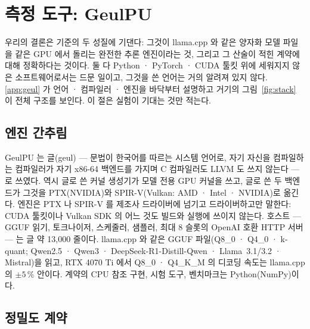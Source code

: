 \documentclass[11pt]{article}
\begin{document}
\section{측정 도구: GeulPU}\label{sec:instrument}

우리의 결론은 기준의 두 성질에 기댄다: 그것이 llama.cpp 와 같은 양자화 모델 파일을 같은 GPU 에서 돌리는 완전한 추론 엔진이라는
것, 그리고 그 산술이 적힌 계약에 대해 정확하다는 것이다. 둘 다 Python · PyTorch · CUDA 툴킷 위에 세워지지 않은 소프트웨어로서는
드문 일이고, 그것을 쓴 언어는 거의 알려져 있지 않다. \ref{app:geul} 가 언어 · 컴파일러 · 엔진을 바닥부터 설명하고 거기의
그림~\ref{fig:stack} 이 전체 구조를 보인다. 이 절은 실험이 기대는 것만 적는다.

\subsection{엔진 간추림}\label{sec:brief}

GeulPU 는 글(geul) --- 문법이 한국어를 따르는 시스템 언어로, 자기 자신을 컴파일하는 컴파일러가 자기 x86-64 백엔드를 가지며 C
컴파일러도 LLVM 도 쓰지 않는다 --- 로 쓰였다. 역시 글로 쓴 커널 생성기가 모델 전용 GPU 커널을 쓰고, 글로 쓴 두 백엔드가 그것을
PTX(NVIDIA)와 SPIR-V(Vulkan: AMD · Intel · NVIDIA)로 옮긴다. 엔진은 PTX 나 SPIR-V 를 제조사 드라이버에 넘기고 드라이버하고만
말한다: CUDA 툴킷이나 Vulkan SDK 의 어느 것도 빌드와 실행에 쓰이지 않는다. 호스트 --- GGUF 읽기, 토크나이저, 스케줄러, 샘플러,
최대 8 슬롯의 OpenAI 호환 HTTP 서버 --- 는 글 약 13,000 줄이다. llama.cpp 와 같은 GGUF 파일(Q8\_0 · Q4\_0 · k-quant; Qwen2.5 ·
Qwen3 · DeepSeek-R1-Distill-Qwen · Llama~3.1/3.2 · Mistral)을 읽고, RTX 4070 Ti 에서 Q8\_0 · Q4\_K\_M 의 디코딩 속도는 llama.cpp
의 $\pm5$\,\% 안이다. 계약의 CPU 참조 구현, 시험 도구, 벤치마크는 Python(NumPy)이다.

\subsection{정밀도 계약}\label{sec:contract}
\end{document}
